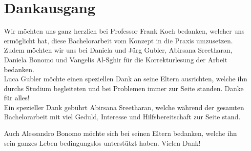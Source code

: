 \section{Dankausgang}
Wir möchten uns ganz herzlich bei Professor Frank Koch bedanken, welcher uns ermöglicht hat, diese Bachelorarbeit vom Konzept in die Praxis umzusetzen. \\

Zudem möchten wir uns bei Daniela und Jürg Gubler, Abirsana Sreetharan, Daniela Bonomo und Vangelis Al-Sghir für die Korrekturlesung der Arbeit bedanken. \\


Luca Gubler möchte einen speziellen Dank an seine Eltern ausrichten, welche ihn durchs Studium begleiteten und bei Problemen immer zur Seite standen. Danke für alles!\\
Ein spezieller Dank gebührt Abirsana Sreetharan, welche während der gesamten Bachelorarbeit mit viel Geduld, Interesse und Hilfsbereitschaft zur Seite stand.

Auch Alessandro Bonomo möchte sich bei seinen Eltern bedanken, welche ihn sein ganzes Leben bedingungslos unterstützt haben. Vielen Dank!